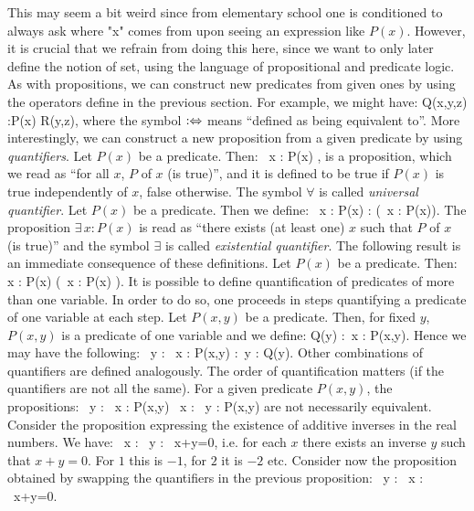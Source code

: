 This may seem a bit weird since from elementary school one is conditioned to always ask where "x" comes from upon seeing an expression like $P(x)$.
However, it is crucial that we refrain from doing this here, since we want to only later define the notion of set, using the language of propositional and predicate logic.
As with propositions, we can construct new predicates from given ones by using the operators define in the previous section. For example, we might have:
\bse
Q(x,y,z) :\eqv P(x) \land R(y,z),
\ese
where the symbol $:\Leftrightarrow$ means ``defined as being equivalent to''.
More interestingly, we can construct a new proposition from a given predicate by using \emph{quantifiers}.
\bd
Let $P(x)$ be a predicate. Then:
\bse
\forall \, x : P(x) ,
\ese
is a proposition, which we read as ``for all $x$, $P$ of $x$ (is true)'', and it is defined to be true if $P(x)$ is true independently of $x$, false otherwise. The symbol $\forall$\index{$\forall$} is called \emph{universal quantifier}.
\ed
\bd
Let $P(x)$ be a predicate.
Then we define:
\bse
\exists \, x : P(x) : \eqv \neg (\forall \, x : \neg P(x)).
\ese
The proposition $\exists \, x : P(x)$ is read as ``there exists (at least one) $x$ such that $P$ of $x$ (is true)'' and the symbol $\exists$\index{$\exists$} is called \emph{existential quantifier}.
\ed
The following result is an immediate consequence of these definitions.
\bc
Let $P(x)$ be a predicate. Then:
\bse
\forall \, x : P(x) \eqv \neg (\exists \, x : \neg P(x) ).
\ese
\ec
\br
It is possible to define quantification of predicates of more than one variable.
In order to do so, one proceeds in steps quantifying a predicate of one variable at each step. 
\er
\be
Let $P(x,y)$ be a predicate.
Then, for fixed $y$, $P(x,y)$ is a predicate of one variable and we define:
\bse
Q(y) :\eqv \forall \, x : P(x,y).
\ese
Hence we may have the following:
\bse
\exists \, y : \forall \, x : P(x,y) :\eqv \exists \, y : Q(y).
\ese
Other combinations of quantifiers are defined analogously.
\ee
\br
The order of quantification matters (if the quantifiers are not all the same).
For a given predicate $P(x,y)$, the propositions:
\bse
\exists \, y : \forall \, x : P(x,y)  \quad {} \quad \forall \, x : \exists \, y : P(x,y) 
\ese
are not necessarily equivalent.
\er
\be
Consider the proposition expressing the existence of additive inverses in the real numbers. We have:
\bse
\forall \, x : \exists \, y : \ x+y=0,
\ese
i.e. for each $x$ there exists an inverse $y$ such that $x+y=0$. For $1$ this is $-1$, for $2$ it is $-2$ etc.
Consider now the proposition obtained by swapping the quantifiers in the previous proposition:
\bse
\exists \, y : \forall \, x : \ x+y=0.
\ese

